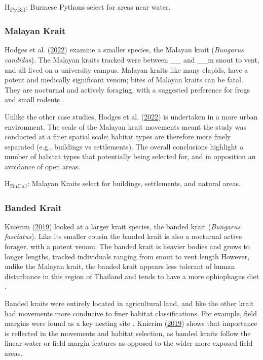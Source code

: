 \documentclass[10pt,a4paper]{article}
\begin{document}
H\textsubscript{PyBi1}: Burmese Pythons select for areas near water.

\hypertarget{malayan-krait}{%
\subsubsection{Malayan Krait}\label{malayan-krait}}

Hodges et al. (\protect\hyperlink{ref-hodges_malayan_2022}{2022}) examine a smaller species, the Malayan krait (\emph{Bungarus candidus}).
The Malayan kraits tracked were between \_\_ and \_\_m snout to vent, and all lived on a university campus.
Malayan kraits like many elapids, have a potent and medically significant venom; bites of Malayan kraits can be fatal.
They are nocturnal and actively foraging, with a suggested preference for frogs and small rodents .

Unlike the other case studies, Hodges et al. (\protect\hyperlink{ref-hodges_malayan_2022}{2022}) is undertaken in a more urban environment.
The scale of the Malayan krait movements meant the study was conducted at a finer spatial scale; habitat types are therefore more finely separated (e.g., buildings vs settlements).
The overall conclusions highlight a number of habitat types that potentially being selected for, and in opposition an avoidance of open areas.

H\textsubscript{BuCa1}: Malayan Kraits select for buildings, settlements, and natural areas.

\hypertarget{banded-krait}{%
\subsubsection{Banded Krait}\label{banded-krait}}

Knierim (\protect\hyperlink{ref-knierim_spatial_2019}{2019}) looked at a larger krait species, the banded krait (\emph{Bungarus fasciatus}).
Like its smaller cousin the banded krait is also a nocturnal active forager, with a potent venom.
The banded krait is heavier bodies and grows to longer lengths, tracked individuals ranging from snout to vent length
However, unlike the Malayan krait, the banded krait appears less tolerant of human disturbance in this region of Thailand and tends to have a more ophiophagus diet .

Banded kraits were entirely located in agricultural land, and like the other krait had movements more conducive to finer habitat classifications.
For example, field margins were found as a key nesting site .
Knierim (\protect\hyperlink{ref-knierim_spatial_2019}{2019}) shows that importance is reflected in the movements and habitat selection, as banded kraits follow the linear water or field margin features as opposed to the wider more exposed field areas.
\end{document}
